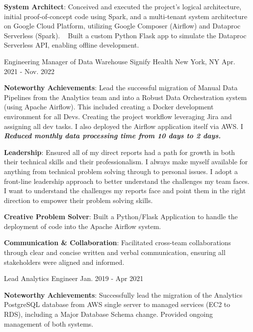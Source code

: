 \begin{cventries}
{\begin{cvitems}
          \item {\textbf{System Architect}: Conceived and executed the project's logical architecture, initial proof-of-concept code using Spark, and a multi-tenant system architecture on Google Cloud Platform, utilizing Google Composer (Airflow) and Dataproc Serverless (Spark). ~ Built a custom Python Flask app to simulate the Dataproc Serverless API, enabling offline development.}
      \end{cvitems}
    }
  \cventry
    {Engineering Manager of Data Warehouse}
    {Signify Health}
    {New York, NY}
    {Apr. 2021 - Nov. 2022}
    {
      \begin{cvitems}
          \item {\textbf{Noteworthy Achievements}: Lead the successful migration of Manual Data Pipelines from the Analytics team and into a Robust Data Orchestration system (using Apache Airflow). This included creating a Docker development environment for all Devs. Creating the project workflow leveraging Jira and assigning all dev tasks. I also deployed the Airflow application itself via AWS. I \textbf{\emph{Reduced monthly data processing time from 10 days to 2 days.}}
          \item {\textbf{Leadership}: Ensured all of my direct reports had a path for growth in both their technical skills and their professionalism. I always make myself available for anything from technical problem solving through to personal issues. I adopt a front-line leadership approach to better understand the challenges my team faces. I want to understand the challenges my reports face and point them in the right direction to empower their problem solving skills.}
          \item {\textbf{Creative Problem Solver}: Built a Python/Flask Application to handle the deployment of code into the Apache Airflow system.}
          \item {\textbf{Communication \& Collaboration}}: Facilitated cross-team collaborations through clear and concise written and verbal communication, ensuring all stakeholders were aligned and informed.}
      \end{cvitems}
    }
  \cventry
    {Lead Analytics Engineer}
    {}
    {}
    {Jan. 2019 - Apr 2021}
    {
      \begin{cvitems}
          \item {\textbf{Noteworthy Achievements}: Successfully lead the migration of the Analytics PostgreSQL database from AWS single server to managed services (EC2 to RDS), including a Major Database Schema change. Provided ongoing management of both systems.}

\end{cvitems}}
\end{cventries}
